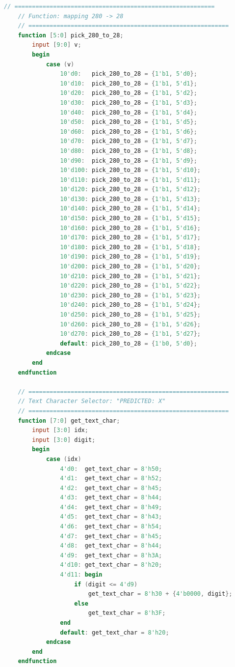 \begin{lstlisting}[language=Verilog, title={Kode untuk menampilkan data hasil vga ke monitor}, label={code:vga-rgb-565}]
    // =========================================================
    // Function: mapping 280 -> 28
    // =========================================================
    function [5:0] pick_280_to_28;
        input [9:0] v;
        begin
            case (v)
                10'd0:   pick_280_to_28 = {1'b1, 5'd0};
                10'd10:  pick_280_to_28 = {1'b1, 5'd1};
                10'd20:  pick_280_to_28 = {1'b1, 5'd2};
                10'd30:  pick_280_to_28 = {1'b1, 5'd3};
                10'd40:  pick_280_to_28 = {1'b1, 5'd4};
                10'd50:  pick_280_to_28 = {1'b1, 5'd5};
                10'd60:  pick_280_to_28 = {1'b1, 5'd6};
                10'd70:  pick_280_to_28 = {1'b1, 5'd7};
                10'd80:  pick_280_to_28 = {1'b1, 5'd8};
                10'd90:  pick_280_to_28 = {1'b1, 5'd9};
                10'd100: pick_280_to_28 = {1'b1, 5'd10};
                10'd110: pick_280_to_28 = {1'b1, 5'd11};
                10'd120: pick_280_to_28 = {1'b1, 5'd12};
                10'd130: pick_280_to_28 = {1'b1, 5'd13};
                10'd140: pick_280_to_28 = {1'b1, 5'd14};
                10'd150: pick_280_to_28 = {1'b1, 5'd15};
                10'd160: pick_280_to_28 = {1'b1, 5'd16};
                10'd170: pick_280_to_28 = {1'b1, 5'd17};
                10'd180: pick_280_to_28 = {1'b1, 5'd18};
                10'd190: pick_280_to_28 = {1'b1, 5'd19};
                10'd200: pick_280_to_28 = {1'b1, 5'd20};
                10'd210: pick_280_to_28 = {1'b1, 5'd21};
                10'd220: pick_280_to_28 = {1'b1, 5'd22};
                10'd230: pick_280_to_28 = {1'b1, 5'd23};
                10'd240: pick_280_to_28 = {1'b1, 5'd24};
                10'd250: pick_280_to_28 = {1'b1, 5'd25};
                10'd260: pick_280_to_28 = {1'b1, 5'd26};
                10'd270: pick_280_to_28 = {1'b1, 5'd27};
                default: pick_280_to_28 = {1'b0, 5'd0};
            endcase
        end
    endfunction

    // =========================================================
    // Text Character Selector: "PREDICTED: X"
    // =========================================================
    function [7:0] get_text_char;
        input [3:0] idx;
        input [3:0] digit;
        begin
            case (idx)
                4'd0:  get_text_char = 8'h50;
                4'd1:  get_text_char = 8'h52;
                4'd2:  get_text_char = 8'h45;
                4'd3:  get_text_char = 8'h44;
                4'd4:  get_text_char = 8'h49;
                4'd5:  get_text_char = 8'h43;
                4'd6:  get_text_char = 8'h54;
                4'd7:  get_text_char = 8'h45;
                4'd8:  get_text_char = 8'h44;
                4'd9:  get_text_char = 8'h3A;
                4'd10: get_text_char = 8'h20;
                4'd11: begin
                    if (digit <= 4'd9)
                        get_text_char = 8'h30 + {4'b0000, digit};
                    else
                        get_text_char = 8'h3F;
                end
                default: get_text_char = 8'h20;
            endcase
        end
    endfunction


\end{lstlisting}
